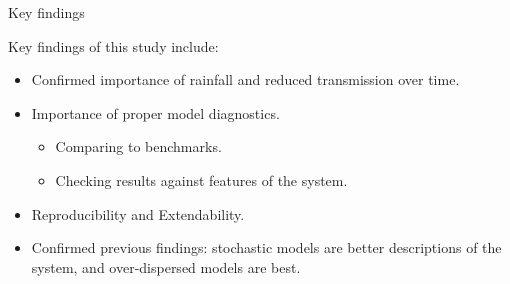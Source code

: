 \documentclass[aspectratio=169]{beamer}\usepackage[]{graphicx}\usepackage[]{xcolor}
\begin{document}
\begin{frame}{Key findings}

Key findings of this study include: 
\begin{itemize}
  \item Confirmed importance of rainfall and reduced transmission over time.
  \item Importance of proper model diagnostics.
  \begin{itemize}
    \item Comparing to benchmarks.
    \item Checking results against features of the system. 
  \end{itemize}
  \item Reproducibility and Extendability. 
  \item Confirmed previous findings: stochastic models are better descriptions of the system, and over-dispersed models are best.
\end{itemize}

\end{frame}
\end{document}
